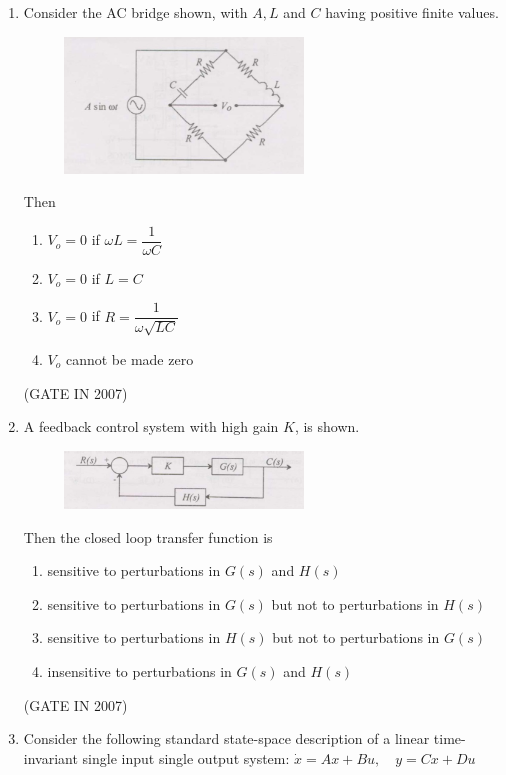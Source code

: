 \documentclass[journal]{IEEEtran}
\begin{document}
\begin{enumerate}
\begin{multicols}{4}
\begin{enumerate}
\item 1.0  
\item 2.0  
\item 4.0  
\end{enumerate}
\end{multicols}
\hfill(GATE IN 2007)
\item Consider the AC bridge shown, with $A, L$ and $C$ having positive finite values. 
\begin{figure}[H]
    \centering
      \includegraphics[width=0.6\textwidth]{10.jpg} 
      \caption{}
    \label{fig:fig10} 
\end{figure}
Then
\begin{multicols}{2}
\begin{enumerate}
\item $V_o = 0$ if $\omega L = \dfrac{1}{\omega C}$  
\item $V_o = 0$ if $L = C$  
\item $V_o = 0$ if $R = \dfrac{1}{\omega \sqrt{LC}}$  
\item $V_o$ cannot be made zero  
\end{enumerate}
\end{multicols}
\hfill(GATE IN 2007)
\item A feedback control system with high gain $K$, is shown. 
\begin{figure}[H]
    \centering
      \includegraphics[width=0.6\textwidth]{11.jpg} 
      \caption{}
    \label{fig:fig11} 
\end{figure}
Then the closed loop transfer function is
\begin{enumerate}
\item sensitive to perturbations in $G(s)$ and $H(s)$  
\item sensitive to perturbations in $G(s)$ but not to perturbations in $H(s)$  
\item sensitive to perturbations in $H(s)$ but not to perturbations in $G(s)$  
\item insensitive to perturbations in $G(s)$ and $H(s)$  
\end{enumerate}
\hfill(GATE IN 2007)
\item Consider the following standard state-space description of a linear time-invariant single input single output system:  
$\dot{x} = Ax + Bu, \quad y = Cx + Du$  


\end{enumerate}
\end{document}
